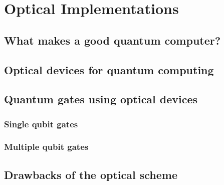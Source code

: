 \chapter{Optical Implementations\label{ch:optimp}}

\section{What makes a good quantum computer?}

\section{Optical devices for quantum computing}

\section{Quantum gates using optical devices}

\subsection{Single qubit gates}

\subsection{Multiple qubit gates}

\section{Drawbacks of the optical scheme}

